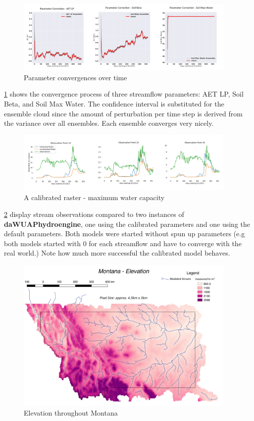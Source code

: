 \begin{figure}[h]
    \centering
    \includegraphics[width=0.95\textwidth]{param}
    \caption{Parameter convergences over time}
    \label{fig:param}
\end{figure} 

\ref{fig:param} shows the convergence process of three streamflow parameters: AET LP, Soil Beta, and Soil Max Water. The confidence interval is substituted for the ensemble cloud since the amount of perturbation per time step is derived from the variance over all ensembles. Each ensemble converges very nicely.

\begin{figure}[h]
    \centering
    \includegraphics[width=0.95\textwidth]{cali}
    \caption{A calibrated raster - maximum water capacity}
    \label{fig:cali}
\end{figure} 

\ref{fig:cali} display stream observations compared to two instances of \textbf{daWUAPhydroengine}, one using the calibrated parameters and one using the default parameters. Both models were started without spun up parameters (e.g both models started with 0 for each streamflow and have to converge with the real world.) Note how much more successful the calibrated model behaves.

\begin{figure}[h]
    \centering
    \includegraphics[width=0.95\textwidth]{elevation}
    \caption{Elevation throughout Montana}
    \label{fig:elevation}
\end{figure}